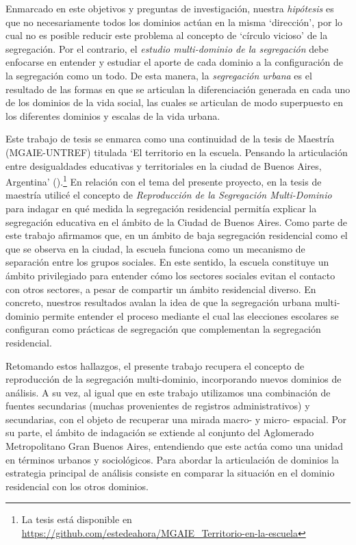\documentclass[
  spanish,
  a4paper,%
  chapterprefix=true,%
  DIV=calc,%
  twoside]{scrbook}%
\begin{document}
Enmarcado en este objetivos y preguntas de investigación, nuestra
\emph{hipótesis} es que no necesariamente todos los dominios actúan en la misma
`dirección', por lo cual no es posible reducir este problema al concepto
de `círculo vicioso' de la segregación. Por el contrario, el \emph{estudio
multi-dominio de la segregación} debe enfocarse en entender y estudiar
el aporte de cada dominio a la configuración de la segregación como un
todo. De esta manera, la \emph{segregación urbana} es el resultado de las
formas en que se articulan la diferenciación generada en cada uno de los
dominios de la vida social, las cuales se articulan de modo superpuesto
en los diferentes dominios y escalas de la vida urbana.

Este trabajo de tesis se enmarca como una continuidad de la tesis de
Maestría (MGAIE-UNTREF) titulada `El territorio en la escuela. Pensando
la articulación entre desigualdades educativas y territoriales en la
ciudad de Buenos Aires, Argentina' ().\footnote{La tesis está disponible en
  \url{https://github.com/estedeahora/MGAIE_Territorio-en-la-escuela}} En
relación con el tema del presente proyecto, en la tesis de maestría
utilicé el concepto de \emph{Reproducción de la Segregación Multi-Dominio}
para indagar en qué medida la segregación residencial permitía explicar
la segregación educativa en el ámbito de la Ciudad de Buenos Aires. Como
parte de este trabajo afirmamos que, en un ámbito de baja segregación
residencial como el que se observa en la ciudad, la escuela funciona
como un mecanismo de separación entre los grupos sociales. En este
sentido, la escuela constituye un ámbito privilegiado para entender cómo
los sectores sociales evitan el contacto con otros sectores, a pesar de
compartir un ámbito residencial diverso. En concreto, nuestros
resultados avalan la idea de que la segregación urbana multi-dominio
permite entender el proceso mediante el cual las elecciones escolares
se configuran como prácticas de segregación que complementan la
segregación residencial.

Retomando estos hallazgos, el presente trabajo recupera el concepto de
reproducción de la segregación multi-dominio, incorporando nuevos
dominios de análisis. A su vez, al igual que en este trabajo utilizamos
una combinación de fuentes secundarias (muchas provenientes de registros
administrativos) y secundarias, con el objeto de recuperar una mirada
macro- y micro- espacial. Por su parte, el ámbito de indagación se
extiende al conjunto del Aglomerado Metropolitano Gran Buenos Aires,
entendiendo que este actúa como una unidad en términos urbanos y
sociológicos. Para
abordar la articulación de dominios la estrategia principal de análisis
consiste en comparar la situación en el dominio residencial con los
otros dominios.
\end{document}
